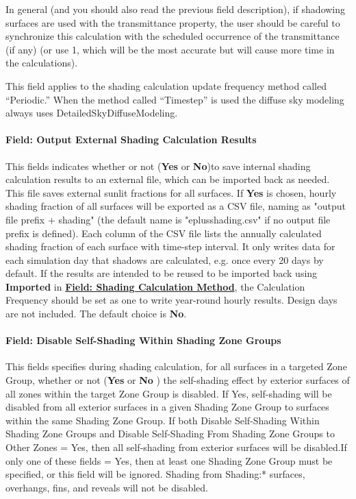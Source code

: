 In general (and you should also read the previous field description), if shadowing surfaces are used with the transmittance property, the user should be careful to synchronize this calculation with the scheduled occurrence of the transmittance (if any) (or use 1, which will be the most accurate but will cause more time in the calculations).

This field applies to the shading calculation update frequency method called ``Periodic.'' When the method called ``Timestep'' is used the diffuse sky modeling always uses DetailedSkyDiffuseModeling.

\paragraph{Field: Output External Shading Calculation Results}\label{field-output-external-shading-calculation-results}
This fields indicates whether or not (\textbf{Yes} or \textbf{No})to save internal shading calculation results to an external file, which can be imported back as needed. This file saves external sunlit fractions for all surfaces. If \textbf{Yes} is chosen, hourly shading fraction of all surfaces will be exported as a CSV file, naming as "output file prefix + shading" (the default name is "eplusshading.csv" if no output file prefix is defined). Each column of the CSV file lists the annually calculated shading fraction of each surface with time-step interval. It only writes data for each simulation day that shadows are calculated, e.g. once every 20 days by default. If the results are intended to be reused to be imported back using \textbf{Imported} in \textbf{\hyperref[field-shading-calculation-method]{Field: Shading Calculation Method}}, the Calculation Frequency should be set as one to write year-round hourly results. Design days are not included. The default choice is \textbf{No}.

\paragraph{Field: Disable Self-Shading Within Shading Zone Groups}\label{field-self--disable-shading-within-a-zone-group}
This fields specifies during shading calculation, for all surfaces in a targeted Zone Group, whether or not (\textbf{Yes} or \textbf{No} ) the self-shading effect by exterior surfaces of all zones within the target Zone Group is disabled. If Yes, self-shading will be disabled from all exterior surfaces in a given Shading Zone Group to surfaces within the same Shading Zone Group. If both Disable Self-Shading Within Shading Zone Groups and Disable Self-Shading From Shading Zone Groups to Other Zones = Yes, then all self-shading from exterior surfaces will be disabled.If only one of these fields = Yes, then at least one Shading Zone Group must be specified, or this field will be ignored. Shading from Shading:* surfaces, overhangs, fins, and reveals will not be disabled.

